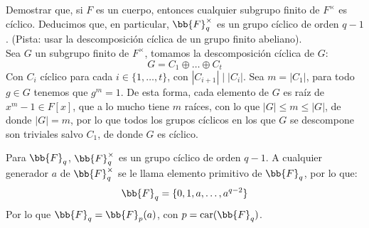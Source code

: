 
\begin{ejercicio}\label{ej:subgrupo_finito}
    Demostrar que, si $F$ es un cuerpo, entonces cualquier subgrupo finito de $F^\times$ es cíclico. Deducimos que, en particular, $\bb{F}_q^\times$ es un grupo cíclico de orden $q-1$. (Pista: usar la descomposición cíclica de un grupo finito abeliano).\\

    \noindent
    Sea $G$ un subgrupo finito de $F^\times$, tomamos la descomposición cíclica de $G$:
    \begin{equation*}
        G = C_1 \oplus \ldots \oplus C_t
    \end{equation*}
    Con $C_i$ cíclico para cada $i \in \{1,\ldots,t\}$, con $|C_{i+1}|\mid |C_i|$. Sea $m = |C_1|$, para todo $g\in G$ tenemos que $g^m = 1$. De esta forma, cada elemento de $G$ es raíz de $x^m-1\in F[x]$, que a lo mucho tiene $m$ raíces, con lo que $|G| \leq m\leq |G|$, de donde $|G| = m$, por lo que todos los grupos cíclicos en los que $G$ se descompone son triviales salvo $C_1$, de donde $G$ es cíclico.
\end{ejercicio}

\begin{observacion}
    Para $\bb{F}_q$, $\bb{F}_q^\times$ es un grupo cíclico de orden $q-1$.\newline
    A cualquier generador $a$ de $\bb{F}_q^\times$ se le llama elemento primitivo de $\bb{F}_q$, por lo que:
    \begin{equation*}
        \bb{F}_q = \{0, 1, a, \ldots, a^{q-2}\}
    \end{equation*}
    Por lo que $\bb{F}_q = \bb{F}_p(a)$, con $p = \car(\bb{F}_q)$.
\end{observacion}

